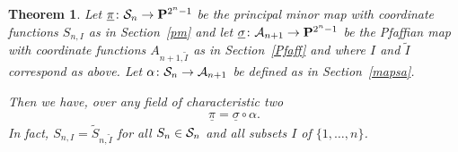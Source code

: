 \documentclass[pdftex]{sigma}
\newcommand{\PP}{{\bf P}}
\newcommand{\cA}{{\cal A}}
\newcommand{\cS}{{\cal S}}
\newcommand{\tI}{{\tilde{I}}}
\newcommand{\tS}{{\tilde{S}}}
\numberwithin{equation}{section}
\newtheorem{Theorem}{Theorem}[section]
\begin{document}
\begin{Theorem} \label{thm} Let $\underline{\pi}\colon \cS_n\rightarrow\PP^{2^n-1}$ be the principal minor map with coordinate functions $S_{n,I}$ as in Section~{\rm \ref{pm}} and let $\underline{\sigma}\colon \cA_{n+1}\rightarrow\PP^{2^n-1}$ be the Pfaffian map with coordinate functions $A_{n+1,\tI}$ as in Section~{\rm \ref{Pfaff}} and where $I$ and $\tI$ correspond as above. Let $\alpha\colon \cS_n\rightarrow\cA_{n+1}$ be defined as in Section~{\rm \ref{mapsa}}.

Then we have, over any field of characteristic two
\begin{gather*}
\underline{\pi} = \underline{\sigma}\circ\alpha.
\end{gather*}
In fact, $S_{n,I}=\tS_{n,\tI}$ for all $S_n\in \cS_n$ and all subsets $I$ of $\{1,\ldots,n\}$.
\end{Theorem}
\end{document}

